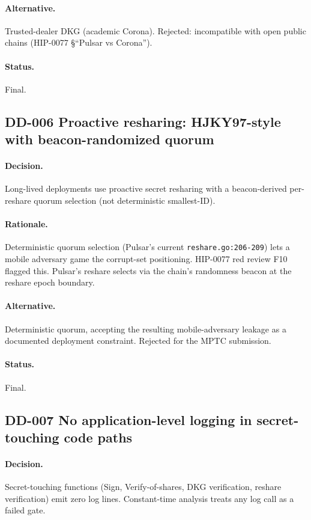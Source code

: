 \paragraph{Alternative.}
Trusted-dealer DKG (academic Corona). Rejected: incompatible with
open public chains (HIP-0077 \S``Pulsar vs Corona'').

\paragraph{Status.}
Final.

\subsection{DD-006 Proactive resharing: HJKY97-style with
beacon-randomized quorum}

\paragraph{Decision.}
Long-lived deployments use proactive secret resharing with a
beacon-derived per-reshare quorum selection (not deterministic
smallest-ID).

\paragraph{Rationale.}
Deterministic quorum selection (Pulsar's current
\texttt{reshare.go:206-209}) lets a mobile adversary game the
corrupt-set positioning. HIP-0077 red review F10 flagged this.
Pulsar's reshare selects via the chain's randomness beacon at the
reshare epoch boundary.

\paragraph{Alternative.}
Deterministic quorum, accepting the resulting mobile-adversary
leakage as a documented deployment constraint. Rejected for the
MPTC submission.

\paragraph{Status.}
Final.

\subsection{DD-007 No application-level logging in secret-touching
code paths}

\paragraph{Decision.}
Secret-touching functions (Sign, Verify-of-shares, DKG verification,
reshare verification) emit zero log lines. Constant-time analysis
treats any log call as a failed gate.

